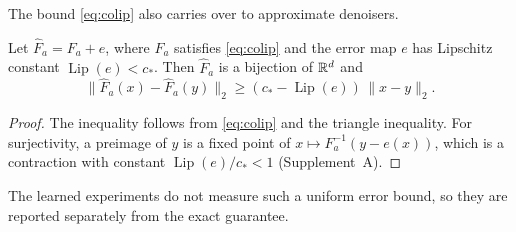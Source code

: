 The bound \cref{eq:colip} also carries over to approximate denoisers.

\begin{proposition}
\label{prop:transfer}
Let $\widehat F_a=F_a+e$, where $F_a$ satisfies \cref{eq:colip} and the error map $e$ has Lipschitz constant $\operatorname{Lip}(e)<c_*$. Then $\widehat F_a$ is a bijection of $\mathbb R^d$ and
\begin{equation}
 \|\widehat F_a(x)-\widehat F_a(y)\|_2\ge(c_*-\operatorname{Lip}(e))\,\|x-y\|_2 .
 \label{eq:transfer}
\end{equation}
\end{proposition}
\begin{proof}
The inequality follows from \cref{eq:colip} and the triangle inequality. For surjectivity, a preimage of $y$ is a fixed point of $x\mapsto F_a^{-1}(y-e(x))$, which is a contraction with constant $\operatorname{Lip}(e)/c_*<1$ (Supplement~A).
\end{proof}

The learned experiments do not measure such a uniform error bound, so they are reported separately from the exact guarantee.
